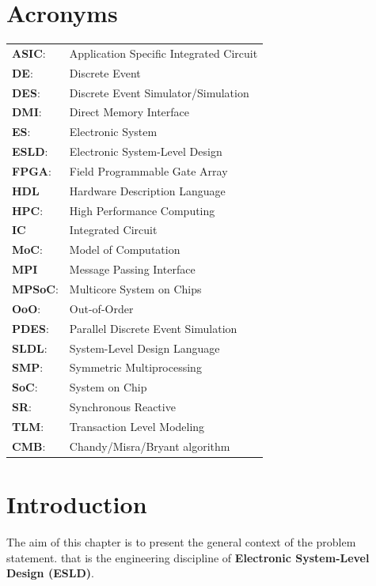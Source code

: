 \documentclass[12pt,twoside]{article}
\begin{document}
\section*{Acronyms}
\label{sec-1}
\begin{center}
\begin{tabular}{ll}
\textbf{ASIC}: & Application Specific Integrated Circuit\\
\textbf{DE}: & Discrete Event\\
\textbf{DES}: & Discrete Event Simulator/Simulation\\
\textbf{DMI}: & Direct Memory Interface\\
\textbf{ES}: & Electronic System\\
\textbf{ESLD}: & Electronic System-Level Design\\
\textbf{FPGA}: & Field Programmable Gate Array\\
\textbf{HDL} & Hardware Description Language\\
\textbf{HPC}: & High Performance Computing\\
\textbf{IC} & Integrated Circuit\\
\textbf{MoC}: & Model of Computation\\
\textbf{MPI} & Message Passing Interface\\
\textbf{MPSoC}: & Multicore System on Chips\\
\textbf{OoO}: & Out-of-Order\\
\textbf{PDES}: & Parallel Discrete Event Simulation\\
\textbf{SLDL}: & System-Level Design Language\\
\textbf{SMP}: & Symmetric Multiprocessing\\
\textbf{SoC}: & System on Chip\\
\textbf{SR}: & Synchronous Reactive\\
\textbf{TLM}: & Transaction Level Modeling\\
\textbf{CMB}: & Chandy/Misra/Bryant algorithm\\
\end{tabular}
\end{center}
\clearpage







\section{Introduction}
\label{sec-3}
The aim of this chapter is to present the general context of the problem statement.
that is the engineering discipline of \textbf{Electronic System-Level Design (ESLD)}.
\end{document}
